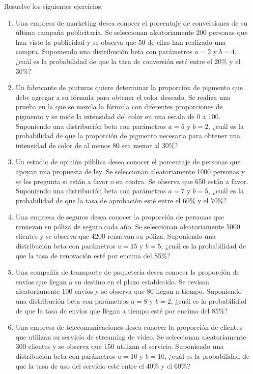 \begin{Ejer}
Resuelve los siguientes ejercicios:
\begin{enumerate}


    \item Una empresa de marketing desea conocer el porcentaje de conversiones de su última campaña publicitaria. Se seleccionan aleatoriamente 200 personas que han visto la publicidad y se observa que 50 de ellas han realizado una compra. Suponiendo una distribución beta con parámetros $a=2$ y $b=4$, ¿cuál es la probabilidad de que la tasa de conversión esté entre el 20\% y el 30\%?

    \item Un fabricante de pinturas quiere determinar la proporción de pigmento que debe agregar a su fórmula para obtener el color deseado. Se realiza una prueba en la que se mezcla la fórmula con diferentes proporciones de pigmento y se mide la intensidad del color en una escala de 0 a 100. Suponiendo una distribución beta con parámetros $a=5$ y $b=2$, ¿cuál es la probabilidad de que la proporción de pigmento necesaria para obtener una intensidad de color de al menos 80 sea menor al 30\%?

    \item Un estudio de opinión pública desea conocer el porcentaje de personas que apoyan una propuesta de ley. Se seleccionan aleatoriamente 1000 personas y se les pregunta si están a favor o en contra. Se observa que 650 están a favor. Suponiendo una distribución beta con parámetros $a=7$ y $b=5$, ¿cuál es la probabilidad de que la tasa de aprobación esté entre el 60\% y el 70\%?

    \item Una empresa de seguros desea conocer la proporción de personas que renuevan su póliza de seguro cada año. Se seleccionan aleatoriamente 5000 clientes y se observa que 4200 renuevan su póliza. Suponiendo una distribución beta con parámetros $a=15$ y $b=5$, ¿cuál es la probabilidad de que la tasa de renovación esté por encima del 85\%?

    \item Una compañía de transporte de paquetería desea conocer la proporción de envíos que llegan a su destino en el plazo establecido. Se revisan aleatoriamente 100 envíos y se observa que 80 llegan a tiempo. Suponiendo una distribución beta con parámetros $a=8$ y $b=2$, ¿cuál es la probabilidad de que la tasa de envíos que llegan a tiempo esté por encima del 85\%?

    \item Una empresa de telecomunicaciones desea conocer la proporción de clientes que utilizan su servicio de streaming de video. Se seleccionan aleatoriamente 300 clientes y se observa que 150 utilizan el servicio. Suponiendo una distribución beta con parámetros $a=10$ y $b=10$, ¿cuál es la probabilidad de que la tasa de uso del servicio esté entre el 40\% y el 60\%?


\end{enumerate}
\end{Ejer}
